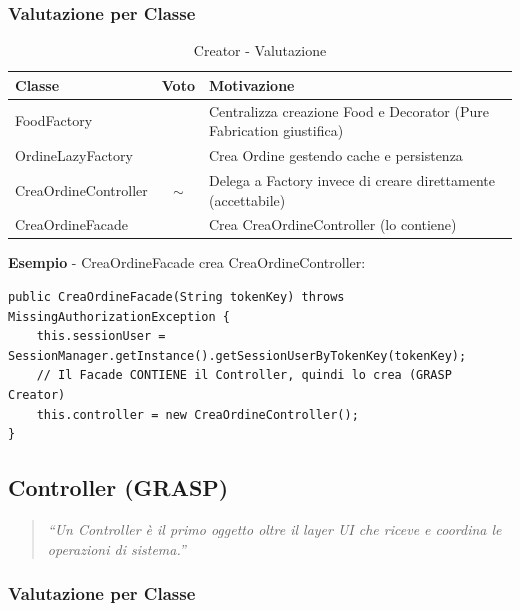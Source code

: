\documentclass[12pt,a4paper]{article}
\newcommand{\ok}{\textcolor{okgreen}{\checkmark}}
\newcommand{\warn}{\textcolor{warnOrange}{$\sim$}}
\begin{document}
\subsubsection{Valutazione per Classe}

\begin{table}[h]
\centering
\begin{tabular}{|l|c|p{8cm}|}
\hline
\textbf{Classe} & \textbf{Voto} & \textbf{Motivazione} \\
\hline
FoodFactory & \ok & Centralizza creazione Food e Decorator (Pure Fabrication giustifica) \\
\hline
OrdineLazyFactory & \ok & Crea Ordine gestendo cache e persistenza \\
\hline
CreaOrdineController & \warn & Delega a Factory invece di creare direttamente (accettabile) \\
\hline
CreaOrdineFacade & \ok & Crea CreaOrdineController (lo contiene) \\
\hline
\end{tabular}
\caption{Creator - Valutazione}
\end{table}

\textbf{Esempio} - CreaOrdineFacade crea CreaOrdineController:

\begin{lstlisting}[style=javastyle, caption={Creator in CreaOrdineFacade}]
public CreaOrdineFacade(String tokenKey) throws MissingAuthorizationException {
    this.sessionUser = SessionManager.getInstance().getSessionUserByTokenKey(tokenKey);
    // Il Facade CONTIENE il Controller, quindi lo crea (GRASP Creator)
    this.controller = new CreaOrdineController();
}
\end{lstlisting}

\subsection{Controller (GRASP)}

\begin{quote}
\textit{``Un Controller è il primo oggetto oltre il layer UI che riceve e coordina le operazioni di sistema.''}
\end{quote}

\subsubsection{Valutazione per Classe}
\end{document}
